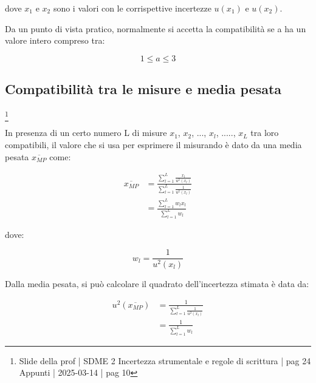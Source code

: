 dove $x_1$ e $x_2$ sono i valori con le corrispettive incertezze $u(x_1)$ e $u(x_2)$. \newline 

Da un punto di vista pratico, 
normalmente si accetta la compatibilità se a ha un valore intero compreso tra: 

{
    \Large 
    \begin{equation}
        1 \leq a \leq 3
    \end{equation}
}


\newpage 

\subsection{Compatibilità tra le misure e media pesata}
\footnote{Slide della prof | SDME 2 Incertezza strumentale e regole di scrittura | pag 24 \\  
Appunti | 2025-03-14 | pag 10}

In presenza di un certo numero L di misure $x_1$, $x_2$, ..., $x_l$, ....., $x_L$ tra loro compatibili, 
il valore che si usa per esprimere il misurando è dato da una media pesata $\overline{x_{MP}}$ come: 

{
    \Large 
    \begin{equation}
        \begin{split}
            \overline{x_{MP}} 
            &= 
            \frac{\sum_{l=1}^{L} \frac{x_l}{u^{2} (x_l)}}
            {\sum_{l=1}^{L} \frac{1}{u^{2} (x_l)}}
            \\
            &= 
            \frac{\sum_{l=1}^{L} w_l x_l}
            {\sum_{l=1}^{L} w_l}
        \end{split}
    \end{equation}
}

dove: 

{
    \Large
    \begin{equation}
        w_l = \frac{1}{u^{2} (x_l)}
    \end{equation}
}

Dalla media pesata, si può calcolare il quadrato dell'incertezza stimata è data da: 

{
    \Large 
    \begin{equation}
        \begin{split}
            u^{2} (\overline{x_{MP}})
            &= 
            \frac{1}{\sum_{l = 1}^{L} \frac{1}{u^{2} (x_l)}}
            \\ 
            &= 
            \frac{1}{\sum_{l=1}^{L} w_l}
        \end{split} 
    \end{equation}
}

